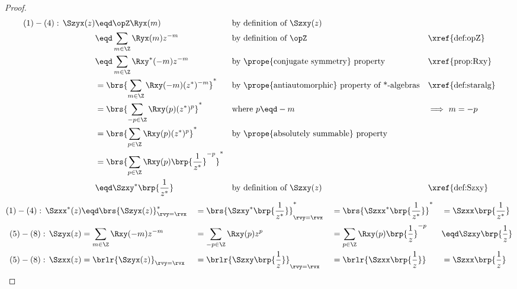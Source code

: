 \begin{proof}
\begin{align*}
  (1)-(4):\,\Szyx(z)
     &\eqd \opZ \Ryx(m)
    && \text{by definition of $\Szxy(z)$}                          && %
  \\&\eqd \sum_{m\in\Z}\Ryx(m) z^{-m}
    && \text{by definition of $\opZ$}                              && \text{\xref{def:opZ}}
  \\&\eqd \sum_{m\in\Z} \Rxy^\ast(-m) z^{-m}
    && \text{by \prope{conjugate symmetry} property}               && \text{\xref{prop:Rxy}}
  \\&= \brs{\sum_{m\in\Z} \Rxy(-m) (z^\ast)^{-m}}^\ast
    && \text{by \prope{antiautomorphic} property of *-algebras}    && \text{\xref{def:staralg}}
  \\&= \brs{\sum_{-p\in\Z} \Rxy(p) (z^\ast)^{p}}^\ast
    && \text{where $p\eqd -m$}                                     && \text{$\implies$ $m=-p$}
  \\&= \brs{\sum_{p\in\Z} \Rxy(p) (z^\ast)^{p}}^\ast
    && \text{by \prope{absolutely summable} property}             %
  \\&= \brs{\sum_{p\in\Z} \Rxy(p) \brp{\frac{1}{z^\ast}}^{-p}}^\ast
  \\&\eqd \Szxy^\ast\brp{\frac{1}{z^\ast}}
    && \text{by definition of $\Szxy(z)$}                          && \text{\xref{def:Szxy}}
\end{align*}
\begin{align*}
  (1)-(4):\,\Szxx^\ast(z)
    &\eqd \brs{\Szyx(z)}^\ast_{\rvy=\rvx}
   &&= \brs{\Szxy^\ast\brp{\frac{1}{z^\ast}}}^\ast_{\rvy=\rvx}
   &&= \brs{\Szxx^\ast\brp{\frac{1}{z^\ast}}}^\ast
   &&= \Szxx\brp{\frac{1}{z^\ast}}
  \\
  (5)-(8):\,\Szyx(z)
    &= \sum_{m\in\Z} \Rxy(-m) z^{-m}
   &&= \sum_{-p\in\Z} \Rxy(p) z^{p}
   &&= \sum_{p\in\Z} \Rxy(p) \brp{\frac{1}{z}}^{-p}
   &&\eqd \Szxy\brp{\frac{1}{z}}
  \\
  (5)-(8):\,\Szxx(z)
    &= \brlr{\Szyx(z)}_{\rvy=\rvx}
   &&= \brlr{\Szxy\brp{\frac{1}{z}}}_{\rvy=\rvx}
   &&= \brlr{\Szxx\brp{\frac{1}{z}}}
   &&= \Szxx\brp{\frac{1}{z}}
\end{align*}
\end{proof}

